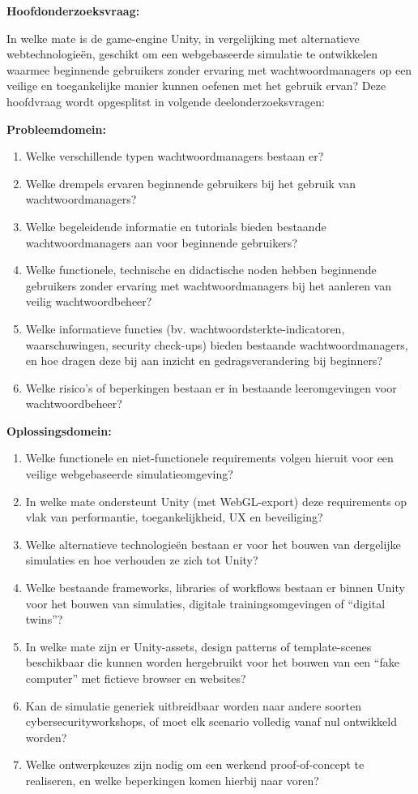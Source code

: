 \textbf{Hoofdonderzoeksvraag:} 

In welke mate is de game-engine Unity, in vergelijking met alternatieve webtechnologieën, geschikt om een webgebaseerde simulatie te ontwikkelen waarmee beginnende gebruikers zonder ervaring met wachtwoordmanagers op een veilige en toegankelijke manier kunnen oefenen met het gebruik ervan?
Deze hoofdvraag wordt opgesplitst in volgende deelonderzoeksvragen:

\textbf{Probleemdomein:}

\begin{enumerate}
    \item Welke verschillende typen wachtwoordmanagers bestaan er?
    \item Welke drempels ervaren beginnende gebruikers bij het gebruik van wachtwoordmanagers?
    \item Welke begeleidende informatie en tutorials bieden bestaande wachtwoordmanagers aan voor beginnende gebruikers?
    \item Welke functionele, technische en didactische noden hebben beginnende gebruikers zonder ervaring met wachtwoordmanagers bij het aanleren van veilig wachtwoordbeheer?
    \item Welke informatieve functies (bv. wachtwoordsterkte-indicatoren, waarschuwingen, security check-ups) bieden bestaande wachtwoordmanagers, en hoe dragen deze bij aan inzicht en gedragsverandering bij beginners?
    \item Welke risico’s of beperkingen bestaan er in bestaande leeromgevingen voor wachtwoordbeheer?
\end{enumerate}

\textbf{Oplossingsdomein:}

\begin{enumerate}
    \item Welke functionele en niet-functionele requirements volgen hieruit voor een veilige webgebaseerde simulatieomgeving?
    \item In welke mate ondersteunt Unity (met WebGL-export) deze requirements op vlak van performantie, toegankelijkheid, UX en beveiliging?
    \item Welke alternatieve technologieën bestaan er voor het bouwen van dergelijke simulaties en hoe verhouden ze zich tot Unity?
    \item Welke bestaande frameworks, libraries of workflows bestaan er binnen Unity voor het bouwen van simulaties, digitale trainingsomgevingen of “digital twins”?
    \item In welke mate zijn er Unity-assets, design patterns of template-scenes beschikbaar die kunnen worden hergebruikt voor het bouwen van een “fake computer” met fictieve browser en websites?
    \item Kan de simulatie generiek uitbreidbaar worden naar andere soorten cyber\-security\-workshops, of moet elk scenario volledig vanaf nul ontwikkeld worden?
    \item Welke ontwerpkeuzes zijn nodig om een werkend proof-of-concept te realiseren, en welke beperkingen komen hierbij naar voren?
\end{enumerate}

